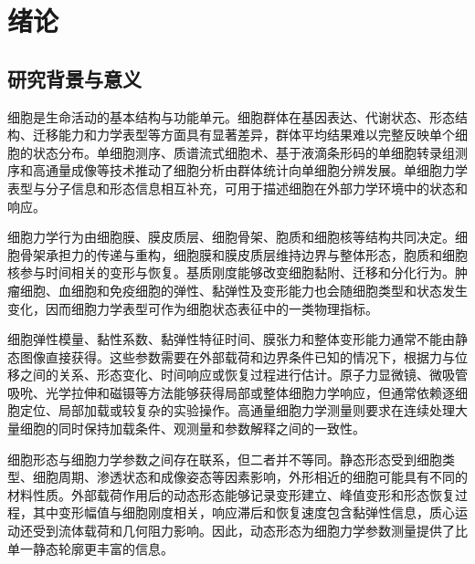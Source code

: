 \chapter{绪论}
\label{cha:chap01}

\section{研究背景与意义}

细胞是生命活动的基本结构与功能单元。细胞群体在基因表达、代谢状态、形态结构、迁移能力和力学表型等方面具有显著差异，群体平均结果难以完整反映单个细胞的状态分布。单细胞测序、质谱流式细胞术、基于液滴条形码的单细胞转录组测序和高通量成像等技术推动了细胞分析由群体统计向单细胞分辨发展\cite{altschuler2010heterogeneity,trapnell2015singlecell,shapiro2013singlecell,bendall2011singlecellmass,macosko2015dropseq,klein2015dropletbarcoding,heath2016singlecelltools,regev2017humancellatlas}。单细胞力学表型与分子信息和形态信息相互补充，可用于描述细胞在外部力学环境中的状态和响应。

细胞力学行为由细胞膜、膜皮质层、细胞骨架、胞质和细胞核等结构共同决定。细胞骨架承担力的传递与重构，细胞膜和膜皮质层维持边界与整体形态，胞质和细胞核参与时间相关的变形与恢复\cite{kasza2007cellmaterial,fletcher2010cellmechanics,wang2009mechanotransduction,moeendarbary2013poroelastic}。基质刚度能够改变细胞黏附、迁移和分化行为\cite{discher2005tissue,engler2006matrix}。肿瘤细胞、血细胞和免疫细胞的弹性、黏弹性及变形能力也会随细胞类型和状态发生变化，因而细胞力学表型可作为细胞状态表征中的一类物理指标\cite{suresh2007cancer,dicarlo2012mechanical,toepfner2018morphorheological}。

细胞弹性模量、黏性系数、黏弹性特征时间、膜张力和整体变形能力通常不能由静态图像直接获得。这些参数需要在外部载荷和边界条件已知的情况下，根据力与位移之间的关系、形态变化、时间响应或恢复过程进行估计。原子力显微镜、微吸管吸吮、光学拉伸和磁镊等方法能够获得局部或整体细胞力学响应，但通常依赖逐细胞定位、局部加载或较复杂的实验操作。高通量细胞力学测量则要求在连续处理大量细胞的同时保持加载条件、观测量和参数解释之间的一致性\cite{darling2015high,dicarlo2012mechanical,urbanska2020comparison}。

细胞形态与细胞力学参数之间存在联系，但二者并不等同。静态形态受到细胞类型、细胞周期、渗透状态和成像姿态等因素影响，外形相近的细胞可能具有不同的材料性质。外部载荷作用后的动态形态能够记录变形建立、峰值变形和形态恢复过程，其中变形幅值与细胞刚度相关，响应滞后和恢复速度包含黏弹性信息，质心运动还受到流体载荷和几何阻力影响\cite{mietke2015rtdc,mokbel2017rtdc,dudani2016viscoelastic,gong2024prediction}。因此，动态形态为细胞力学参数测量提供了比单一静态轮廓更丰富的信息。


